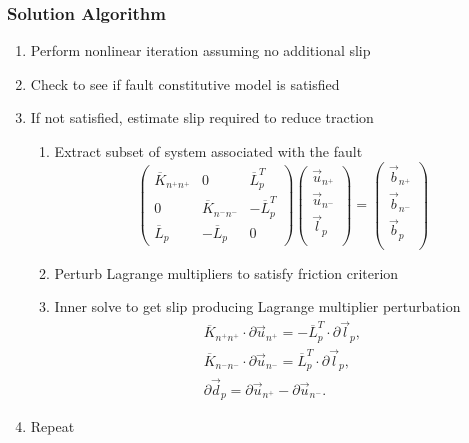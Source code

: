 \documentclass{beamer}
\newcommand{\tensor}[1]{\overline{#1}}
\begin{document}
\begin{frame}
  \frametitle{Solution Algorithm}

  \begin{enumerate}
  \item Perform nonlinear iteration assuming no additional slip
  \item Check to see if fault constitutive model is satisfied
  \item If not satisfied, estimate slip required to reduce traction
    \begin{enumerate}
    \item Extract subset of system associated with the fault
      \begin{equation}
        \begin{pmatrix}
          \tensor{K}_{n^+n^+} & 0 & \tensor{L}_p^T  \\
          0 & \tensor{K}_{n^-n^-} & -\tensor{L}_p^T \\
          \tensor{L}_p & -\tensor{L}_p & 0
        \end{pmatrix}
        \begin{pmatrix}
          \vec{u}_{n^+} \\
          \vec{u}_{n^-} \\
          \vec{l}_p \\
        \end{pmatrix}
        =
        \begin{pmatrix}
          \vec{b}_{n^+} \\
          \vec{b}_{n^-} \\
          \vec{b}_p \\
        \end{pmatrix}
      \end{equation}
    \item Perturb Lagrange multipliers to satisfy friction criterion
    \item Inner solve to get slip producing Lagrange multiplier perturbation
      \vspace*{-2mm}
      \begin{gather}
        \tensor{K}_{n^+n^+} \cdot \partial \vec{u}_{n^+} = 
        - \tensor{L}_p^T \cdot \partial \vec{l}_p, \\
        \tensor{K}_{n^-n^-} \cdot \partial \vec{u}_{n^-} =
        \tensor{L}_p^T \cdot \partial \vec{l}_p, \\
        \partial \vec{d}_p =  \partial \vec{u}_{n^+} - \partial \vec{u}_{n^-}.        
      \end{gather}
    \end{enumerate}
  \item Repeat
  \end{enumerate}

\end{frame}
\end{document}

